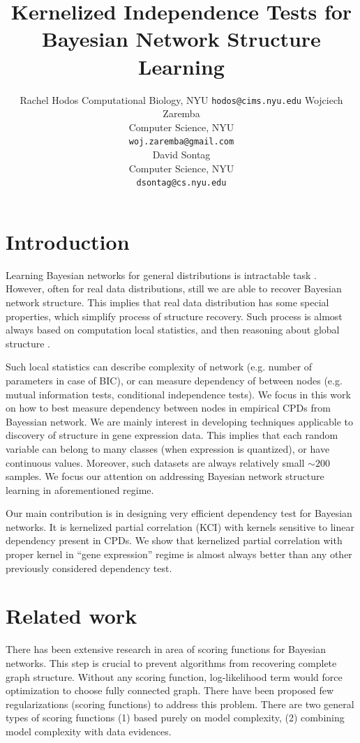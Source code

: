 \documentclass{article} %
\title{Kernelized Independence Tests for Bayesian Network Structure Learning}
\author{
Rachel Hodos
Computational Biology, NYU
\texttt{hodos@cims.nyu.edu}
\And
Wojciech Zaremba \\
Computer Science, NYU \\
\texttt{woj.zaremba@gmail.com} \\
\AND
David Sontag \\
Computer Science, NYU \\
\texttt{dsontag@cs.nyu.edu} \\
}
\begin{document}
\maketitle

\begin{abstract}

\end{abstract}


\section{Introduction}
Learning Bayesian networks for general distributions is
intractable task \cite{chickering1996learning}. However, often
for real data distributions, still we are able to 
recover Bayesian network structure. This implies that real data
distribution has some special properties, which simplify process
of structure recovery. Such process is almost always
based on computation local statistics, and then 
reasoning about global structure \cite{jaakkola2010learning, tsamardinos2006max}. 


Such local statistics can describe
complexity of network (e.g. number of parameters in case of BIC\cite{schwarz1978estimating}), or
can measure dependency of between nodes (e.g. mutual information tests, 
conditional independence tests). 
We focus in this work on how to best measure dependency between nodes
in empirical CPDs from Bayessian network. We are mainly interest
in developing techniques applicable to discovery of structure
in gene expression data. This implies that each random variable
can belong to many classes (when expression is quantized), or have continuous
values. Moreover, such datasets are always relatively small $\sim200$ samples.
We focus our attention on addressing Bayesian network structure learning
in aforementioned regime. 


Our main contribution is in designing very efficient dependency test
for Bayesian networks. It is kernelized partial correlation (KCI) with
kernels sensitive to linear dependency present in CPDs. We show
that kernelized partial correlation with proper kernel in ``gene expression''
regime is almost always better than any other previously considered
dependency test. 


\section{Related work}
There has been extensive research in area of scoring functions for
Bayesian networks. This step is crucial to prevent algorithms from 
recovering complete graph structure.
Without any scoring function, log-likelihood term would force optimization
to choose fully connected graph. There have been proposed few regularizations (scoring functions)
to address this problem. There are two general types of scoring functions 
(1) based purely on model complexity, (2) combining model complexity with data evidences.
\end{document}
